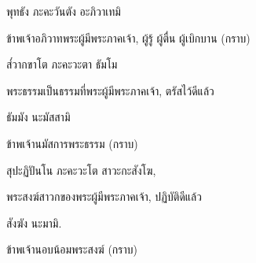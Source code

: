 \documentclass{article}
\begin{document}
พุทธัง ภะคะวันตัง อะภิวาเทมิ
\begin{description}
ข้าพเจ้าอภิวาทพระผู้มีพระภาคเจ้า, ผู้รู้ ผู้ตื่น ผู้เบิกบาน (กราบ)
\end{description}
ส๎วากขาโต ภะคะวะตา ธัมโม 
\begin{description}
พระธรรมเป็นธรรมที่พระผู้มีพระภาคเจ้า, ตรัสไว้ดีแล้ว
\end{description}
ธัมมัง นะมัสสามิ
\begin{description}
ข้าพเจ้านมัสการพระธรรม (กราบ)
\end{description}
สุปะฏิปันโน ภะคะวะโต สาวะกะสังโฆ,
\begin{description}
พระสงฆ์สาวกของพระผู้มีพระภาคเจ้า, ปฏิบัติดีแล้ว
\end{description}
สังฆัง นะมามิ.
\begin{description}
ข้าพเจ้านอบน้อมพระสงฆ์ (กราบ)
\end{description}
\newpage
\end{document}
